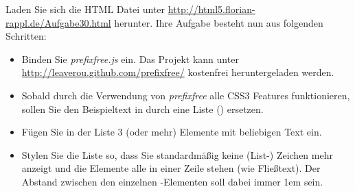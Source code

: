 %
\par Laden Sie sich die HTML Datei unter \url{http://html5.florian-rappl.de/Aufgabe30.html} herunter. Ihre Aufgabe besteht nun aus folgenden Schritten:
%
\begin{itemize}
\item Binden Sie \emph{prefixfree.js} ein. Das Projekt kann unter \url{http://leaverou.github.com/prefixfree/} kostenfrei heruntergeladen werden.
\item Sobald durch die Verwendung von \emph{prefixfree} alle CSS3 Features funktionieren, sollen Sie den Beispieltext in  durch eine Liste () ersetzen.
\item Fügen Sie in der Liste 3 (oder mehr)  Elemente mit beliebigen Text ein.
\item Stylen Sie die Liste so, dass Sie standardmäßig keine (List-) Zeichen mehr anzeigt und die Elemente alle in einer Zeile stehen (wie Fließtext). Der Abstand zwischen den einzelnen -Elementen soll dabei immer 1em sein.
\end{itemize}